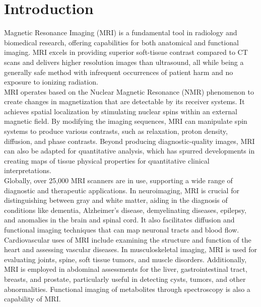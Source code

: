 \chapter{Introduction}\label{ch:introduction}
Magnetic Resonance Imaging (MRI) is a fundamental tool in radiology and biomedical research, offering capabilities for both anatomical and functional imaging. MRI excels in providing superior soft-tissue contrast compared to CT scans and delivers higher resolution images than ultrasound, all while being a generally safe method with infrequent occurrences of patient harm \cite{incidentRates} and no exposure to ionizing radiation.\\

MRI operates based on the Nuclear Magnetic Resonance (NMR) phenomenon to create changes in magnetization that are detectable by its receiver systems. It achieves spatial localization by stimulating nuclear spins within an external magnetic field. By modifying the imaging sequences, MRI can manipulate spin systems to produce various contrasts, such as relaxation, proton density, diffusion, and phase contrasts. Beyond producing diagnostic-quality images, MRI can also be adapted for quantitative analysis, which has spurred developments in creating maps of tissue physical properties for quantitative clinical interpretations.\cite{quantitativeMri}\\

Globally, over 25,000 MRI scanners are in use, supporting a wide range of diagnostic and therapeutic applications. In neuroimaging, MRI is crucial for distinguishing between gray and white matter, aiding in the diagnosis of conditions like dementia, Alzheimer’s disease, demyelinating diseases, epilepsy, and anomalies in the brain and spinal cord. It also facilitates diffusion and functional imaging techniques that can map neuronal tracts and blood flow. Cardiovascular uses of MRI include examining the structure and function of the heart and assessing vascular diseases. In musculoskeletal imaging, MRI is used for evaluating joints, spine, soft tissue tumors, and muscle disorders. Additionally, MRI is employed in abdominal assessments for the liver, gastrointestinal tract, breasts, and prostate, particularly useful in detecting cysts, tumors, and other abnormalities. Functional imaging of metabolites through spectroscopy is also a capability of MRI.
\cite{wikipediaMri}